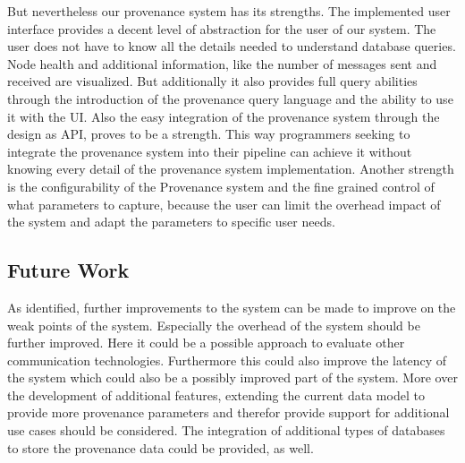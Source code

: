 But nevertheless our provenance system has its strengths. 
The implemented user interface provides a decent level of abstraction for the user of our system. The user does not have to know all the details needed to understand database queries. Node health and additional information, like the number of messages sent and received are visualized. But additionally it also provides full query abilities through the introduction of the provenance query language and the ability to use it with the UI. Also the easy integration of the provenance system through the design as API, proves to be a strength. This way programmers seeking to integrate the provenance system into their pipeline can achieve it without knowing every detail of the provenance system implementation. Another strength is the configurability of the Provenance system and the fine grained control of what parameters to capture, because the user can limit the overhead impact of the system and adapt the parameters to specific user needs.

\subsection{Future Work}
As identified, further improvements to the system can be made to improve on the weak points of the system. Especially the overhead of the system should be further improved. Here it could be a possible approach to evaluate other communication technologies. Furthermore this could also improve the latency of the system which could also be a possibly improved part of the system. More over the development of additional features, extending the current data model to provide more provenance parameters and therefor provide support for additional use cases should be considered. The integration of additional types of databases to store the provenance data could be provided, as well. 